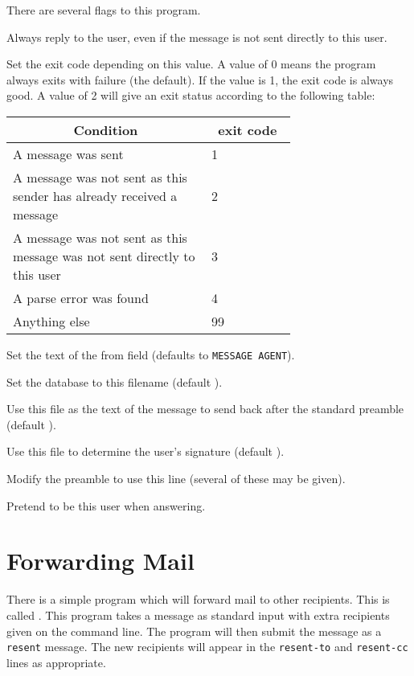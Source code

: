 There are several flags to this program.
\begin{describe}
\item[\verb|-F|:] Always reply to the user, even if the message is not
sent directly to this user.
\item[\verb|-e value|:] Set the exit code depending on this value. A
value of 0 means the program always exits with failure (the default).
If the value is 1, the exit code is always good. A value of 2 will
give an exit status according to the following table:

\begin{tabular}{|p{0.7\linewidth}|l|}
\hline
	\multicolumn{1}{|c|}{\bf Condition} &
		\multicolumn{1}{|c|}{\bf exit code} \\
\hline\hline
	A message was sent & 1 \\
	A message was not sent as  this sender has already
received a message & 2 \\
	A message was not sent as this message was not sent directly
to this user & 3 \\
	A parse error was found & 4 \\
	Anything else & 99 \\
\hline
\end{tabular}

\item[\verb|-f|:] Set the text of the from field (defaults to
\verb|MESSAGE AGENT|).
\item[\verb|-l file|:] Set the database to this filename (default
).
\item[\verb|-n|:] Use this file as the text of the message to send
back after the standard preamble (default ).
\item[\verb|-s|:] Use this file to determine the user's signature
(default ).
\item[\verb|-t text|:] Modify the preamble to use this line (several
of these may be given).
\item[\verb|-u user|:] Pretend to be this user when answering.
\end{describe}
		

\section{Forwarding Mail}
There is a simple program which will forward mail to other recipients.
This is called . This program takes a message as standard
input with extra recipients given on the command line. The program
will then submit the message as a \verb|resent| message. The new
recipients will appear in the \verb|resent-to| and \verb|resent-cc|
lines as appropriate.

